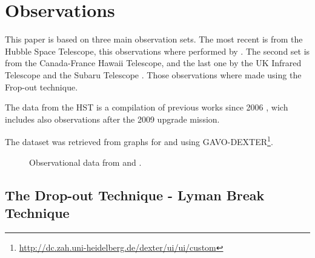 \section{Observations}

This paper is based on three main observation sets. The most recent is from the
Hubble Space Telescope, this observations where performed by \cite{bouwens14}.
The second set is from the Canada-France Hawaii Telescope, \cite{willott13} and
the last one by the UK Infrared Telescope and the Subaru Telescope
\cite{mclure09}. Those observations where made using the Frop-out technique.

The data from the HST is a compilation of previous works since
2006 \citep{bouwens06}, wich includes also observations after the 2009
upgrade mission\citep{bouwens12}. 

The dataset was retrieved from graphs for \cite{bouwens14} and \cite{mclure09} 
using
GAVO-DEXTER\footnote{\url{http://dc.zah.uni-heidelberg.de/dexter/ui/ui/custom}}.



\begin{figure}
\caption{Observational data from \cite{bouwens14,mclure09}and \cite{willott13}.}
\label{graph_observational_data}
\end{figure}

     
\subsection{The Drop-out Technique - Lyman Break Technique}

\cite{steidel03}